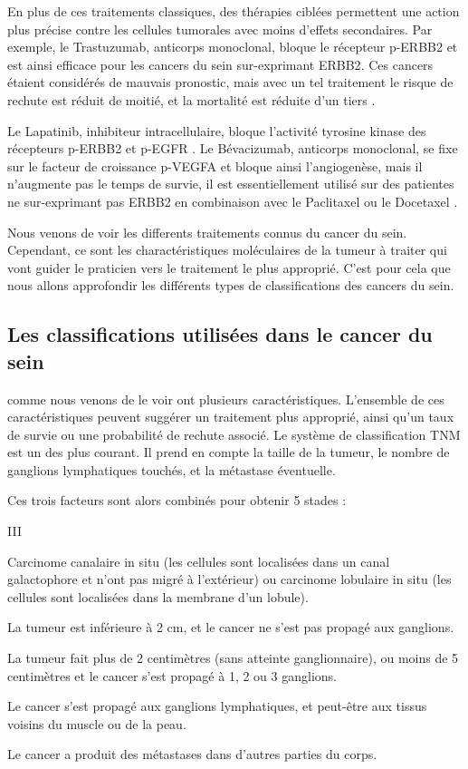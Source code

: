 			En plus de ces traitements classiques, des thérapies ciblées permettent une action plus précise contre les cellules tumorales avec moins d'effets secondaires.
			Par exemple, le Trastuzumab, anticorps monoclonal, bloque le récepteur \acs{p-ERBB2} et est ainsi efficace pour les cancers du sein sur-exprimant \acs{ERBB2}.
			Ces cancers étaient considérés de mauvais pronostic, mais avec un tel traitement le risque de rechute est réduit de moitié, et la mortalité est réduite d'un tiers \citep{Hudis2007}.

			Le Lapatinib, inhibiteur intracellulaire, bloque l'activité tyrosine kinase des récepteurs \acs{p-ERBB2} et \acs{p-EGFR} \citep{Burris2004,Higa2007}.
			Le Bévacizumab, anticorps monoclonal, se fixe sur le facteur de croissance \acs{p-VEGFA} et bloque ainsi l'angiogenèse, mais il n'augmente pas le temps de survie, il est essentiellement utilisé sur des patientes ne sur-exprimant pas \acs{ERBB2} en combinaison avec le Paclitaxel \citep{Miller2007a, Montero2012} ou le Docetaxel \citep{Miles2010}.

			Nous venons de voir les differents traitements connus du cancer du sein.
			Cependant, ce sont les charactéristiques moléculaires de la tumeur à traiter qui vont guider le praticien vers le traitement le plus approprié.
			C'est pour cela que nous allons approfondir les différents types de classifications des cancers du sein.

		\subsection{\textcolor{red!45!black}{Les classifications utilisées dans le cancer du sein}}
			 comme nous venons de le voir ont plusieurs caractéristiques.
			L'ensemble de ces caractéristiques peuvent suggérer un traitement plus approprié, ainsi qu'un taux de survie ou une probabilité de rechute associé.
			Le système de classification \ac{TNM} est un des plus courant.
			Il prend en compte la taille de la tumeur, le nombre de ganglions lymphatiques touchés, et la métastase éventuelle.

			Ces trois facteurs sont alors combinés pour obtenir 5 stades :
			\begin{mylist}{III}
				\item [0]   Carcinome canalaire in situ (les cellules sont localisées dans un canal galactophore et n'ont pas migré à l'extérieur) ou carcinome lobulaire in situ (les cellules sont localisées dans la membrane d'un lobule).
				\item [I]   La tumeur est inférieure à 2 cm, et le cancer ne s'est pas propagé aux ganglions.
				\item [II]  La tumeur fait plus de 2 centimètres (sans atteinte ganglionnaire), ou moins de 5 centimètres et le cancer s'est propagé à 1, 2 ou 3 ganglions.
				\item [III] Le cancer s'est propagé aux ganglions lymphatiques, et peut-être aux tissus voisins du muscle ou de la peau.
				\item [IV]  Le cancer a produit des métastases dans d'autres parties du corps.
			\end{mylist}
			\vspace{1.5em}

